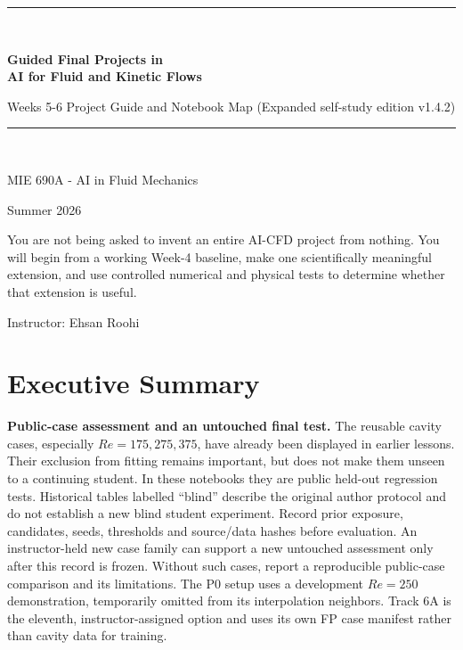 \documentclass[11pt]{article}
\begin{document}
\begin{titlepage}
\centering
\vspace*{1.0cm}
{\color{black}\rule{\textwidth}{2pt}}\\[0.45cm]
{\Huge\bfseries Guided Final Projects in\\[0.15cm]AI for Fluid and Kinetic Flows\par}
\vspace{0.35cm}
{\Large Weeks 5-6 Project Guide and Notebook Map (Expanded self-study edition v1.4.2)\par}
\vspace{0.45cm}
{\color{black}\rule{\textwidth}{2pt}}\\[0.9cm]
{\Large MIE 690A - AI in Fluid Mechanics\par}
\vspace{0.2cm}
{\large Summer 2026\par}
\vfill
\begin{summarybox}
You are not being asked to invent an entire AI-CFD project from nothing. You will begin from a working Week-4 baseline, make one scientifically meaningful extension, and use controlled numerical and physical tests to determine whether that extension is useful.
\end{summarybox}
\vfill
{\large Instructor: Ehsan Roohi\par}
\end{titlepage}

\tableofcontents
\newpage

\section{Executive Summary}
\begin{warningbox}
\textbf{Public-case assessment and an untouched final test.}
The reusable cavity cases, especially $Re=175,275,375$, have already been displayed
in earlier lessons. Their exclusion from fitting remains important, but does not
make them unseen to a continuing student. In these notebooks they are public
held-out regression tests. Historical tables labelled ``blind'' describe the
original author protocol and do not establish a new blind student experiment.
Record prior exposure, candidates, seeds, thresholds and source/data hashes
before evaluation. An instructor-held new case family can support a new
untouched assessment only after this record is frozen. Without such cases,
report a reproducible public-case comparison and its limitations.
The P0 setup uses a development $Re=250$ demonstration, temporarily omitted
from its interpolation neighbors. Track 6A is the eleventh, instructor-assigned
option and uses its own FP case manifest rather than cavity data for training.
\end{warningbox}
\end{document}
